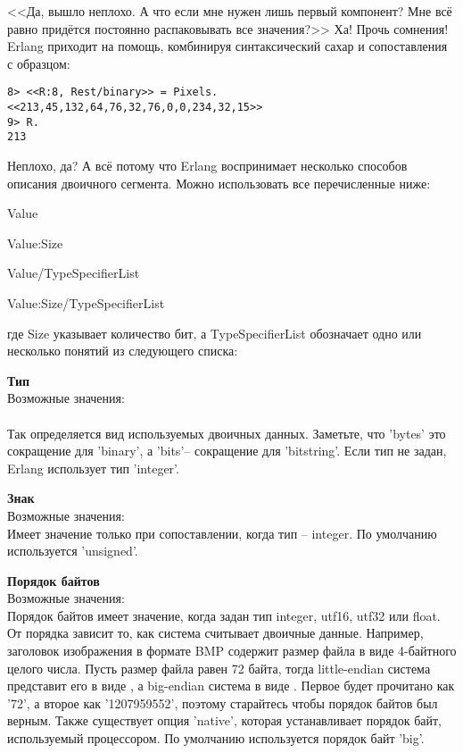<<Да, вышло неплохо. А что если мне нужен лишь первый компонент? Мне всё равно придётся постоянно распаковывать все значения?>> Ха! Прочь сомнения! Erlang приходит на помощь, комбинируя синтаксический сахар и сопоставления с образцом:
\begin{lstlisting}[style=repl]
8> <<R:8, Rest/binary>> = Pixels.
<<213,45,132,64,76,32,76,0,0,234,32,15>>
9> R.
213
\end{lstlisting}

Неплохо, да? А всё потому что Erlang воспринимает несколько способов описания двоичного сегмента. Можно использовать все перечисленные ниже:

Value

Value:Size

Value/TypeSpecifierList

Value:Size/TypeSpecifierList

где Size указывает количество бит, а TypeSpecifierList обозначает одно или несколько понятий из следующего списка:

\begin{minipage}{\textwidth}
\textbf{Тип}\\ 
Возможные значения: \\ 
\\  
Так определяется вид используемых двоичных данных. Заметьте, что 'bytes' это сокращение для 'binary', а 'bits'\--- сокращение для 'bitstring'. Если тип не задан, Erlang использует тип 'integer'.\\ 
\end{minipage}

\begin{minipage}{\textwidth}
    \textbf{Знак}\\ 
    Возможные значения: \\ 
    Имеет значение только при сопоставлении, когда тип \--- integer. По умолчанию используется 'unsigned'.\\ 
\end{minipage}

\begin{minipage}{\textwidth}
    \textbf{Порядок байтов}\\ 
    Возможные значения: \\ 
    Порядок байтов имеет значение, когда задан тип integer, utf16, utf32 или float. От порядка зависит то, как система считывает двоичные данные. Например, заголовок изображения в формате BMP содержит размер файла в виде 4\--байтного целого числа. Пусть размер файла равен 72 байта, тогда little\--endian система представит его в виде , а big\--endian система в виде . Первое будет прочитано как '72', а второе как '1207959552', поэтому старайтесь чтобы порядок байтов был верным. Также существует опция 'native', которая устанавливает порядок байт, используемый процессором. По умолчанию используется порядок байт 'big'.\\ 
\end{minipage}

